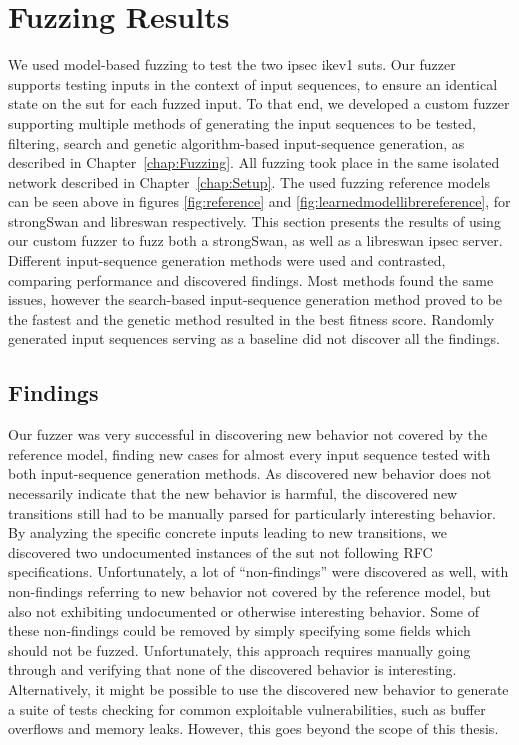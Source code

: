 \section{Fuzzing Results} \label{sec:fuzzresults}
We used model-based fuzzing to test the two \ac{ipsec} \ac{ike}v1 \acp{sut}. Our fuzzer supports testing inputs in the context of input sequences, to ensure an identical state on the \ac{sut} for each fuzzed input. To that end, we developed a custom fuzzer supporting multiple methods of generating the input sequences to be tested, filtering, search and genetic algorithm-based input-sequence generation, as described in Chapter~\ref{chap:Fuzzing}. All fuzzing took place in the same isolated network described in Chapter~\ref{chap:Setup}. The used fuzzing reference models can be seen above in figures \ref{fig:reference} and \ref{fig:learnedmodellibrereference}, for strongSwan and libreswan respectively. This section presents the results of using our custom fuzzer to fuzz both a strongSwan, as well as a libreswan \ac{ipsec} server. Different input-sequence generation methods were used and contrasted, comparing performance and discovered findings. Most methods found the same issues, however the search-based input-sequence generation method proved to be the fastest and the genetic method resulted in the best fitness score. Randomly generated input sequences serving as a baseline did not discover all the findings. 

\subsection{Findings} \label{subsec:findings}
Our fuzzer was very successful in discovering new behavior not covered by the reference model, finding new cases for almost every input sequence tested with both input-sequence generation methods. As discovered new behavior does not necessarily indicate that the new behavior is harmful, the discovered new transitions still had to be manually parsed for particularly interesting behavior. By analyzing the specific concrete inputs leading to new transitions, we discovered two undocumented instances of the \ac{sut} not following RFC specifications. Unfortunately, a lot of ``non-findings'' were discovered as well, with non-findings referring to new behavior not covered by the reference model, but also not exhibiting undocumented or otherwise interesting behavior. Some of these non-findings could be removed by simply specifying some fields which should not be fuzzed. Unfortunately, this approach requires manually going through and verifying that none of the discovered behavior is interesting. Alternatively, it might be possible to use the discovered new behavior to generate a suite of tests checking for common exploitable vulnerabilities, such as buffer overflows and memory leaks. However, this goes beyond the scope of this thesis.

